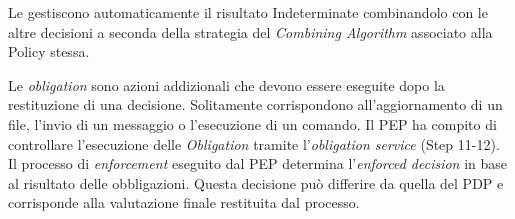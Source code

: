 Le \ePolicy gestiscono automaticamente il risultato Indeterminate combinandolo con le altre decisioni
a seconda della strategia del \emph{Combining Algorithm} associato alla Policy stessa.\par
Le \emph{obligation} sono azioni addizionali che devono essere eseguite dopo la restituzione di una decisione.
Solitamente corrispondono all'aggiornamento di un file, l'invio di un messaggio o l'esecuzione di un comando.
Il \ac{PEP} ha compito di controllare l'esecuzione delle \emph{Obligation} tramite l'\emph{obligation service} (Step 11-12).
Il processo di \emph{enforcement} eseguito dal \ac{PEP} determina l'\emph{enforced decision} in base al risultato delle obbligazioni.
Questa decisione può differire da quella del \ac{PDP} e corrisponde alla valutazione finale restituita dal processo.


